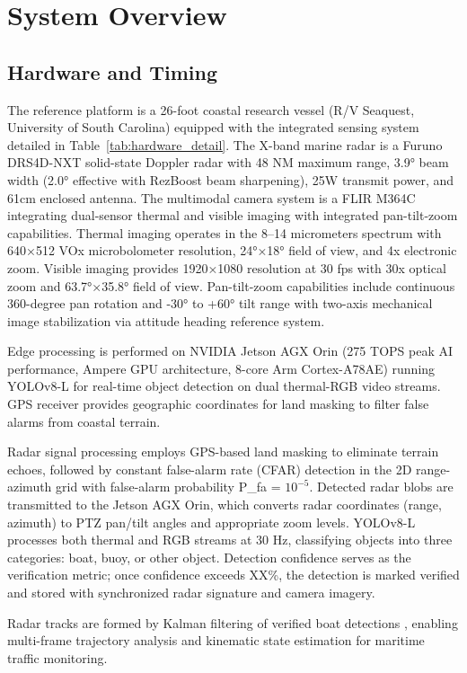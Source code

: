 \documentclass[conf]{asmeconf}
\begin{document}
\section{System Overview}

\subsection{Hardware and Timing}

The reference platform is a 26-foot coastal research vessel (R/V Seaquest, University of South Carolina) equipped with the integrated sensing system detailed in Table~\ref{tab:hardware_detail}. The X-band marine radar is a Furuno DRS4D-NXT solid-state Doppler radar with 48 NM maximum range, 3.9° beam width (2.0° effective with RezBoost beam sharpening), 25W transmit power, and 61cm enclosed antenna. The multimodal camera system is a FLIR M364C integrating dual-sensor thermal and visible imaging with integrated pan-tilt-zoom capabilities. Thermal imaging operates in the 8--14 micrometers spectrum with 640×512 VOx microbolometer resolution, 24°×18° field of view, and 4x electronic zoom. Visible imaging provides 1920×1080 resolution at 30 fps with 30x optical zoom and 63.7°×35.8° field of view. Pan-tilt-zoom capabilities include continuous 360-degree pan rotation and -30° to +60° tilt range with two-axis mechanical image stabilization via attitude heading reference system.

Edge processing is performed on NVIDIA Jetson AGX Orin (275 TOPS peak AI performance, Ampere GPU architecture, 8-core Arm Cortex-A78AE) running YOLOv8-L for real-time object detection on dual thermal-RGB video streams. GPS receiver provides geographic coordinates for land masking to filter false alarms from coastal terrain.

Radar signal processing employs GPS-based land masking to eliminate terrain echoes, followed by constant false-alarm rate (CFAR) detection in the 2D range-azimuth grid with false-alarm probability P_fa = $10^{-5}$. Detected radar blobs are transmitted to the Jetson AGX Orin, which converts radar coordinates (range, azimuth) to PTZ pan/tilt angles and appropriate zoom levels. YOLOv8-L processes both thermal and RGB streams at 30 Hz, classifying objects into three categories: boat, buoy, or other object. Detection confidence serves as the verification metric; once confidence exceeds XX\%, the detection is marked verified and stored with synchronized radar signature and camera imagery.

Radar tracks are formed by Kalman filtering of verified boat detections \cite{Welch1995Kalman}, enabling multi-frame trajectory analysis and kinematic state estimation for maritime traffic monitoring.
\end{document}
